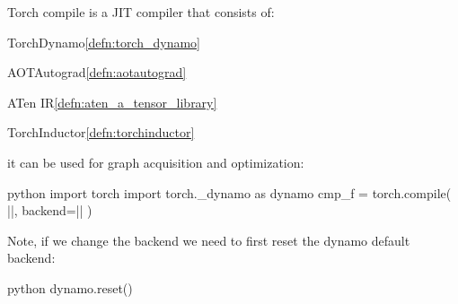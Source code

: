 \begin{defnbox}\nospacing
    \begin{defn}\label{defn:torch_compile}
        Torch compile is a JIT compiler that consists of:
        \begin{circlelistnosep}
            \item TorchDynamo\cref{defn:torch_dynamo}
            \item AOTAutograd\cref{defn:aotautograd}
            \item ATen IR\cref{defn:aten_a_tensor_library}
            \item TorchInductor\cref{defn:torchinductor}
        \end{circlelistnosep}
        it can be used for graph acquisition and optimization:
        \begin{mintlinebox}{python}
           import torch
           import torch._dynamo as dynamo
           cmp_f = torch.compile(
               |\texttt{}|, backend=|\texttt{}|
           )
        \end{mintlinebox}
    \end{defn}
\end{defnbox}
\begin{notebox}\nospacing
    Note, if we change the backend we need to first reset the dynamo default backend:
    \begin{plaincodebox}[colback=notebox]{python}
    dynamo.reset()
    \end{plaincodebox}
\end{notebox}



